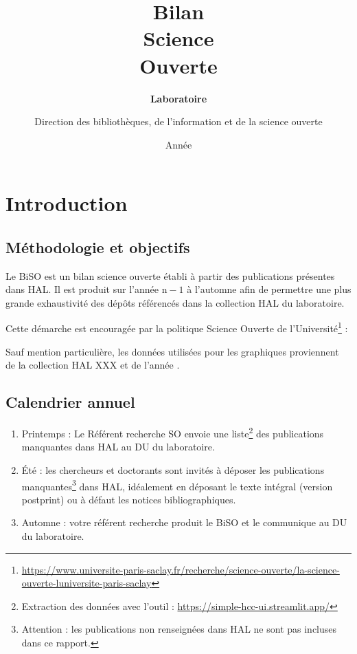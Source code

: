 \documentclass[french, 11pt]{dibiso/biso}
\title{Bilan \\ Science \\ Ouverte}
\author{Direction des bibliothèques, de l'information et de la science ouverte}
\date{Année \reportyear}
\subtitle{\textbf{Laboratoire \labacronym} \\
  \medskip
  \labfullname
}
\begin{document}
\renewcommand{\arraystretch}{2}


\maketitle

\tableofcontents

\pagebreak



\section{Introduction}


\subsection*{Méthodologie et objectifs}

Le BiSO est un bilan science ouverte établi à partir des publications présentes dans HAL. Il est produit sur l'année $\mathrm{n} - 1$ à l'automne afin de permettre une plus grande exhaustivité des dépôts référencés dans la collection HAL du laboratoire.

Cette démarche est encouragée par la politique Science Ouverte de l'Université\footnote{\url{https://www.universite-paris-saclay.fr/recherche/science-ouverte/la-science-ouverte-luniversite-paris-saclay}} : \\

Sauf mention particulière, les données utilisées pour les graphiques proviennent de la collection HAL XXX et de l'année {\reportyear}.

\subsection*{Calendrier annuel}

\begin{enumerate}
  \item Printemps : Le Référent recherche SO envoie une liste\footnote{Extraction des données avec l'outil  : \url{https://simple-hcc-ui.streamlit.app/}} des publications manquantes dans HAL au DU du laboratoire.
  \item Été : les chercheurs et doctorants sont invités à déposer les publications manquantes\footnote{Attention : les publications non renseignées dans HAL ne sont pas incluses dans ce rapport.} dans HAL, idéalement en déposant le texte intégral (version postprint) ou à défaut les notices bibliographiques.
  \item Automne : votre référent recherche produit le BiSO et le communique au DU du laboratoire.
\end{enumerate}
\end{document}
